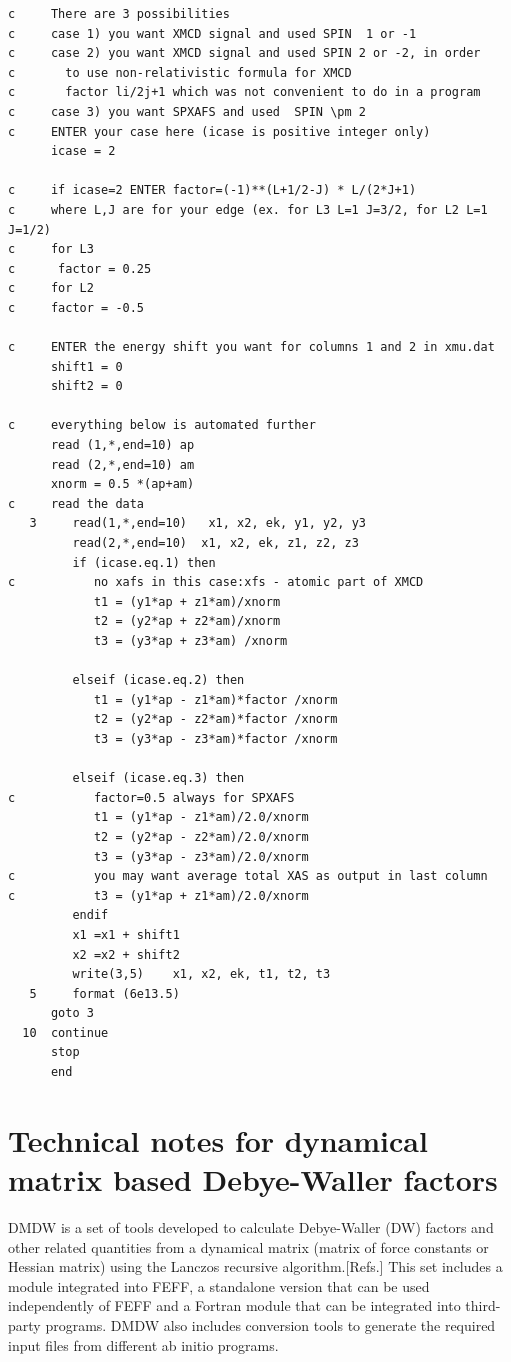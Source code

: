 \documentclass[11pt,oneside]{report} %
\begin{document}
\begin{latexonly}
\begin{verbatim}
c     There are 3 possibilities
c     case 1) you want XMCD signal and used SPIN  1 or -1
c     case 2) you want XMCD signal and used SPIN 2 or -2, in order
c       to use non-relativistic formula for XMCD
c       factor li/2j+1 which was not convenient to do in a program
c     case 3) you want SPXAFS and used  SPIN \pm 2
c     ENTER your case here (icase is positive integer only)
      icase = 2

c     if icase=2 ENTER factor=(-1)**(L+1/2-J) * L/(2*J+1)
c     where L,J are for your edge (ex. for L3 L=1 J=3/2, for L2 L=1 J=1/2)
c     for L3
c      factor = 0.25
c     for L2
c     factor = -0.5

c     ENTER the energy shift you want for columns 1 and 2 in xmu.dat
      shift1 = 0
      shift2 = 0

c     everything below is automated further
      read (1,*,end=10) ap
      read (2,*,end=10) am
      xnorm = 0.5 *(ap+am)
c     read the data
   3     read(1,*,end=10)   x1, x2, ek, y1, y2, y3
         read(2,*,end=10)  x1, x2, ek, z1, z2, z3
         if (icase.eq.1) then
c           no xafs in this case:xfs - atomic part of XMCD
            t1 = (y1*ap + z1*am)/xnorm
            t2 = (y2*ap + z2*am)/xnorm
            t3 = (y3*ap + z3*am) /xnorm

         elseif (icase.eq.2) then
            t1 = (y1*ap - z1*am)*factor /xnorm
            t2 = (y2*ap - z2*am)*factor /xnorm
            t3 = (y3*ap - z3*am)*factor /xnorm

         elseif (icase.eq.3) then
c           factor=0.5 always for SPXAFS
            t1 = (y1*ap - z1*am)/2.0/xnorm
            t2 = (y2*ap - z2*am)/2.0/xnorm
            t3 = (y3*ap - z3*am)/2.0/xnorm
c           you may want average total XAS as output in last column
c           t3 = (y1*ap + z1*am)/2.0/xnorm
         endif
         x1 =x1 + shift1
         x2 =x2 + shift2
         write(3,5)    x1, x2, ek, t1, t2, t3
   5     format (6e13.5)
      goto 3
  10  continue
      stop
      end
\end{verbatim}



\chapter{Technical notes for dynamical matrix based Debye-Waller factors}
\label{sec:Append-G-DMDW}
DMDW is a set of tools developed to calculate Debye-Waller (DW) factors and
other related quantities from a dynamical matrix (matrix of force constants or
Hessian matrix) using the Lanczos recursive algorithm.[Refs.] This set includes
a module integrated into FEFF, a standalone version that can be used
independently of FEFF and a Fortran module that can be integrated into
third-party programs. DMDW also includes conversion tools to generate the
required input files from different ab initio programs.


\end{latexonly}
\end{document}
